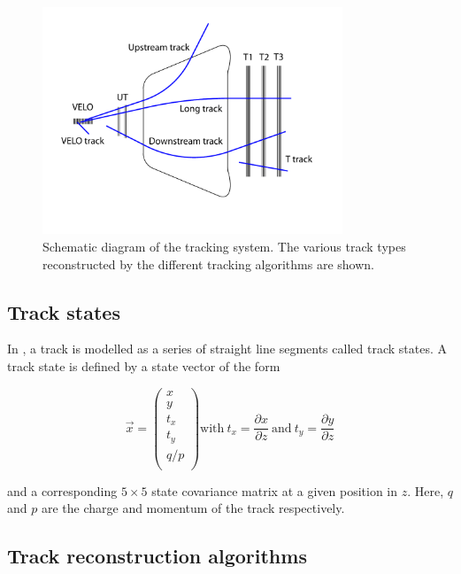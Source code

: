 \begin{figure}[!htb]
\centering
\includegraphics[width=0.8\textwidth]{figs/tracking/trackTypes.pdf}
\caption{Schematic diagram of the \lhcb tracking system. The various track types reconstructed by the different tracking algorithms are shown.}
\label{fig:track-types}
\end{figure}

\subsection{Track states}
\label{sec:track:track-states}

In \lhcb, a track is modelled as a series of straight line segments
called track states. A track state is defined by a state vector of the form

\begin{equation}
\vec x = 
\begin{pmatrix}
x \\
y \\
t_{x} \\
t_{y} \\
q/p \\
\end{pmatrix}
\text{with}~t_{x} = \frac{\partial x}{\partial z} ~\text{and}~ t_{y} = \frac{\partial y}{\partial z} 
\end{equation}

\noindent and a corresponding $5\times5$ state covariance matrix at a given position in $z$. Here, $q$ and $p$ are the charge and momentum of the track respectively.

\subsection{Track reconstruction algorithms}
\label{sec:track:algos}

